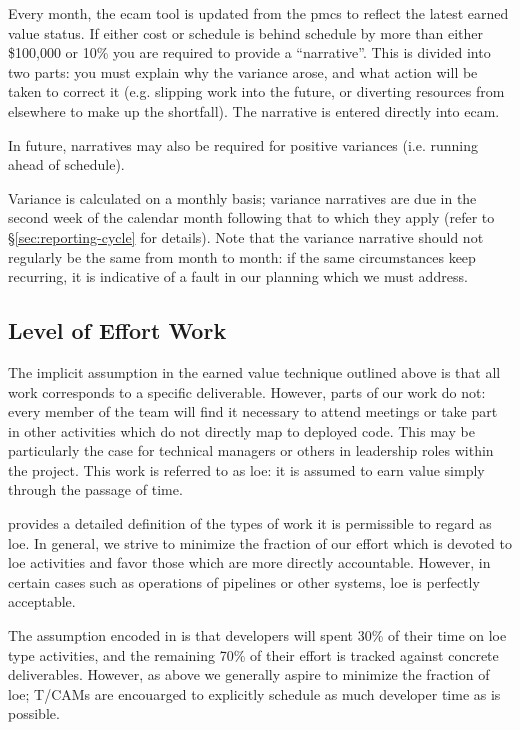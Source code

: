Every month, the \gls{ecam} tool is updated from the \gls{pmcs} to reflect the latest earned value status.
If either cost or schedule is behind schedule by more than either \$100,000 or 10\% you are required to provide a ``narrative''.
This is divided into two parts: you must explain why the variance arose, and what action will be taken to correct it (e.g.  slipping work into the future, or diverting resources from elsewhere to make up the shortfall).
The narrative is entered directly into \gls{ecam}.

In future, narratives may also be required for positive variances (i.e. running ahead of schedule).

Variance is calculated on a monthly basis; variance narratives are due in the second week of the calendar month following that to which they apply (refer to \S\ref{sec:reporting-cycle} for details).
Note that the variance narrative should not regularly be the same from month to month: if the same circumstances keep recurring, it is indicative of a fault in our planning which we must address.

\subsection{Level of Effort Work}
\label{sec:loe}

The implicit assumption in the earned value technique outlined above is that all work corresponds to a specific deliverable.
However, parts of our work do not: every member of the team will find it necessary to attend meetings or take part in other activities which do not directly map to deployed code.
This may be particularly the case for technical managers or others in leadership roles within the project.
This work is referred to as \gls{loe}: it is assumed to earn value simply through the passage of time.

 provides a detailed definition of the types of work it is permissible to regard as \gls{loe}.
In general, we strive to minimize the fraction of our effort which is devoted to \gls{loe} activities and favor those which are more directly accountable.
However, in certain cases such as operations of pipelines or other systems, \gls{loe} is perfectly acceptable.

The assumption encoded in  is that developers will spent 30\% of their time on \gls{loe} type activities, and the remaining 70\% of their effort is tracked against concrete deliverables.
However, as above we generally aspire to minimize the fraction of \gls{loe}; T/CAMs are encouarged to explicitly schedule as much developer time as is possible.

